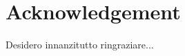 \chapter{Acknowledgement}
\setlength{\parskip}{0.8em}

Desidero innanzitutto ringraziare...

\setlength{\parskip}{0em}